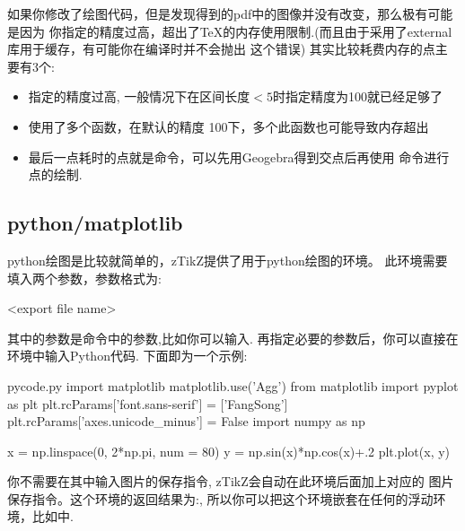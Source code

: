 \begin{leftbar}
\noindent 如果你修改了绘图代码，但是发现得到的pdf中的图像并没有改变，那么极有可能是因为
你指定的精度过高，超出了\TeX{}的内存使用限制.(而且由于采用了external库用于缓存，有可能你在编译时并不会抛出
这个错误) 其实比较耗费内存的点主要有3个:
\begin{itemize}
    \item 指定的精度过高, 一般情况下在区间长度$<5$时指定精度为100就已经足够了
    \item 使用了多个\cmd{\ContourPlot}函数，在默认的精度 100下，多个此函数也可能导致内存超出
    \item 最后一点耗时的点就是\cmd{\ShowIntersecion}命令，可以先用Geogebra得到交点后再使用
        \cmd{\ShowPoint}命令进行点的绘制.
\end{itemize}
\end{leftbar}

\subsection{python/matplotlib}
python绘图是比较就简单的，zTikZ提供了用于python绘图的环境。
此环境需要填入两个参数，参数格式为:

\begin{codeprint}
\begin{pyfig}[<width>]{<export file name>}
\end{pyfig}
\end{codeprint}

其中的参数是命令\cmd{\texttt{[image: ]}}中的参数,比如你可以输入. 
再指定必要的参数后，你可以直接在环境中输入Python代码. 下面即为一个示例:

\begin{codeprint}
\begin{pyfig}[width=.45\linewidth]{pycode.py}
import matplotlib 
matplotlib.use('Agg')
from matplotlib import pyplot as plt
plt.rcParams['font.sans-serif'] = ['FangSong']  
plt.rcParams['axes.unicode_minus'] = False
import numpy as np

x = np.linspace(0, 2*np.pi, num = 80)
y = np.sin(x)*np.cos(x)+.2
plt.plot(x, y)
\end{pyfig}
\end{codeprint}

你不需要在其中输入图片的保存指令, zTikZ会自动在此环境后面加上对应的
图片保存指令。这个环境的返回结果为:,
所以你可以把这个环境嵌套在任何的浮动环境，比如中. 

